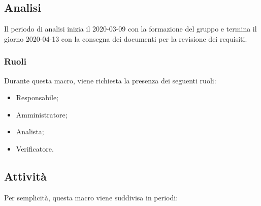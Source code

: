 \documentclass[../piano-di-progetto.tex]{subfiles}
\begin{document}
\subsection{Analisi}
Il periodo di analisi inizia il 2020-03-09 con la formazione del gruppo e termina il giorno 2020-04-13 con la consegna dei documenti per la revisione dei requisiti. 

\subsubsection{Ruoli}
Durante questa macro, viene richiesta la presenza dei seguenti ruoli:
\begin{itemize}
    \item Responsabile;
    \item Amministratore;
    \item Analista;
    \item Verificatore.
\end{itemize}

\subsection{Attività}
Per semplicità, questa macro viene suddivisa in periodi:
\end{document}
